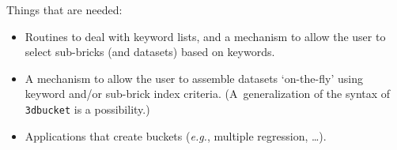 Things that are needed:
\begin{itemize}
  \item Routines to deal with keyword lists, and a mechanism to
        allow the user to select sub-bricks (and datasets) based on keywords.
  \item A mechanism to allow the user to assemble datasets `on-the-fly'
        using keyword and/or sub-brick index criteria.  (A~generalization
        of the syntax of {\tt 3dbucket} is a possibility.)
  \item Applications that create buckets ({\it e.g.}, multiple regression, \ldots).
\end{itemize}


